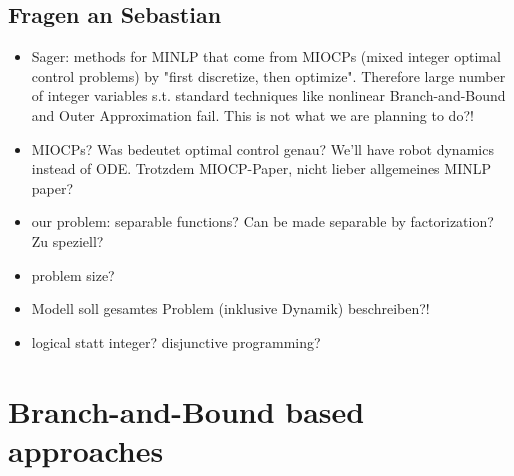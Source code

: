 \documentclass{article}
\begin{document}
\subsection{Fragen an Sebastian}
\begin{itemize}
\item Sager: methods for MINLP that come from MIOCPs (mixed integer optimal control problems) by "first discretize, then optimize". Therefore large number of integer variables s.t. standard techniques like nonlinear Branch-and-Bound and Outer Approximation fail. This is not what we are planning to do?!
\item MIOCPs? Was bedeutet optimal control genau? We'll have robot dynamics instead of ODE. Trotzdem MIOCP-Paper, nicht lieber allgemeines MINLP paper?
\item our problem: separable functions? Can be made separable by factorization? Zu speziell?
\item problem size?
\item Modell soll gesamtes Problem (inklusive Dynamik) beschreiben?!
\item logical statt integer? disjunctive programming?
\end{itemize}
\newpage
\section{Branch-and-Bound based approaches}
\end{document}
